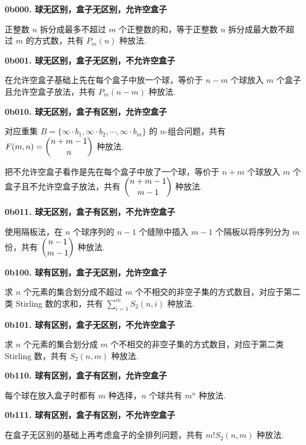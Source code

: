 \documentclass[cn, hazy, blue, normal, 12pt]{elegantnote}
\begin{document}
\begin{solution}[print=true]

    \textbf{0b000. 球无区别，盒子无区别，允许空盒子}

    正整数 $n$ 拆分成最多不超过 $m$ 个正整数的和，等于正整数 $n$ 拆分成最大数不超过 $m$ 的方式数，共有 $P_m(n)$ 种放法.

    \textbf{0b001. 球无区别，盒子无区别，不允许空盒子}

    在允许空盒子基础上先在每个盒子中放一个球，等价于 $n-m$ 个球放入 $m$ 个盒子且允许空盒子放法，共有 $P_m(n-m)$ 种放法.

    \textbf{0b010. 球无区别，盒子有区别，允许空盒子}

    对应重集 $B=\{\infty \cdot b_1,\infty \cdot b_2,\cdots,\infty \cdot b_m\}$ 的 $n\text{-}$组合问题，共有 $F(m,n)=\dbinom{n+m-1}{n}$ 种放法.

    把不允许空盒子看作是先在每个盒子中放了一个球，等价于 $n+m$ 个球放入 $m$ 个盒子且不允许空盒子放法，共有 $\dbinom{n+m-1}{m-1}$ 种放法.

    \textbf{0b011. 球无区别，盒子有区别，不允许空盒子}

    使用隔板法，在 $n$ 个球序列的 $n-1$ 个缝隙中插入 $m-1$ 个隔板以将序列分为 $m$ 份，共有 $\dbinom{n-1}{m-1}$ 种放法.

    \textbf{0b100. 球有区别，盒子无区别，允许空盒子}

    求 $n$ 个元素的集合划分成不超过 $m$ 个不相交的非空子集的方式数目，对应于第二类 Stirling 数的求和，共有 $\sum\limits_{i=1}^{m} S_2(n,i)$ 种放法.

    \textbf{0b101. 球有区别，盒子无区别，不允许空盒子}

    求 $n$ 个元素的集合划分成 $m$ 个不相交的非空子集的方式数目，对应于第二类 Stirling 数，共有 $S_2(n,m)$ 种放法.

    \textbf{0b110. 球有区别，盒子有区别，允许空盒子}

    每个球在放入盒子时都有 $m$ 种选择，$n$ 个球共有 $m^n$ 种放法.

    \textbf{0b111. 球有区别，盒子有区别，不允许空盒子}

    在盒子无区别的基础上再考虑盒子的全排列问题，共有 $m! S_2(n,m)$ 种放法.

\end{solution}
\end{document}
